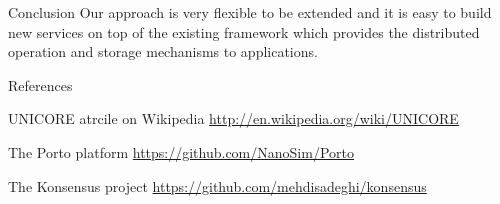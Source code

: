 \documentclass[final,hyperref={pdfpagelabels=true}]{beamer}
\newenvironment{postit}
{\begin{beamercolorbox}[sep=1em,wd=7cm]{postit}}
{\end{beamercolorbox}}
\begin{document}
\begin{frame}
\begin{columns}[t]
\begin{column}{.45\textwidth}
\begin{block}{Conclusion}
	  Our approach is very flexible to be extended and it is easy to build new services on top of the existing framework 
	  which provides the distributed operation and storage mechanisms to applications.
	  \end{block}
      \begin{block}{References}
      \fontsize{17pt}{18}\selectfont
        \begin{thebibliography}{999}
        UNICORE atrcile on Wikipedia
        \url{http://en.wikipedia.org/wiki/UNICORE}
        
        The Porto platform
        \url{https://github.com/NanoSim/Porto}
        
        The Konsensus project \url{https://github.com/mehdisadeghi/konsensus}
%          
          
        \end{thebibliography}
      \end{block}
    \end{column}
  \end{columns}

  
\end{frame}
\end{document}
